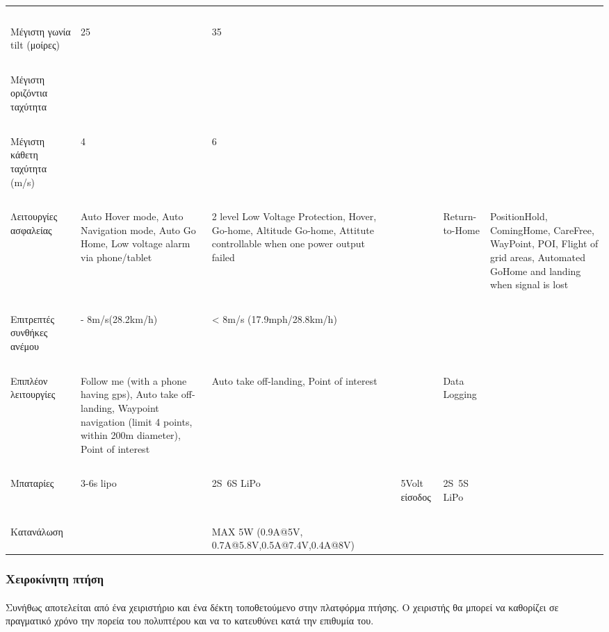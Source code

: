 \documentclass[a4paper, 12pt, twoside]{report}
\begin{document}
{{{{{{\begin{landscape}
\begin{longtable} { m{3cm} m{3cm} m{3cm} m{3cm} m{3cm} m{3cm} }
					\hdashline
					~\\
					Μέγιστη γωνία tilt (μοίρες) & 25 & 35 & & & \\
					\hdashline
					~\\
					Μέγιστη οριζόντια ταχύτητα &  & & & & \\
					\hdashline
					~\\
					Μέγιστη κάθετη ταχύτητα (m/s) & 4 & 6 & & & \\
					\hdashline
					~\\
					Λειτουργίες ασφαλείας & Auto Hover mode, Auto Navigation mode, Auto Go Home, Low voltage alarm via phone/tablet & 2 level Low Voltage Protection, Hover, Go-home, Altitude Go-home, Attitute controllable when one power output failed & & Return-to-Home & PositionHold, ComingHome, CareFree, WayPoint, POI, Flight of grid areas, Automated GoHome and landing when signal is lost\\
					\hdashline
					~\\
					Επιτρεπτές συνθήκες ανέμου & - 8m/s(28.2km/h) & < 8m/s (17.9mph/28.8km/h) & & & \\
					\hdashline
					~\\
					Επιπλέον λειτουργίες & Follow me (with a phone having gps), Auto take off-landing, Waypoint navigation (limit 4 points, within 200m diameter), Point of interest & Auto take off-landing, Point of interest & & Data Logging & \\
					\hdashline
					~\\
					Μπαταρίες & 3-6s lipo & 2S~6S LiPo & 5Volt είσοδος & 2S~5S LiPo  & \\
					\hdashline
					~\\
					Κατανάλωση & & MAX 5W (0.9A@5V, 0.7A@5.8V,0.5A@7.4V,0.4A@8V) & & & \\
					\hline
				\end{longtable}
				\end{landscape}

		
		\subsubsection{Xειροκίνητη πτήση}
			\paragraph{}{Συνήθως αποτελείται από ένα χειριστήριο και ένα δέκτη τοποθετούμενο στην πλατφόρμα πτήσης. Ο χειριστής θα μπορεί να καθορίζει σε πραγματικό χρόνο την πορεία του πολυπτέρου και να το κατευθύνει κατά την επιθυμία του.
			}
}}}}}}
\end{document}
